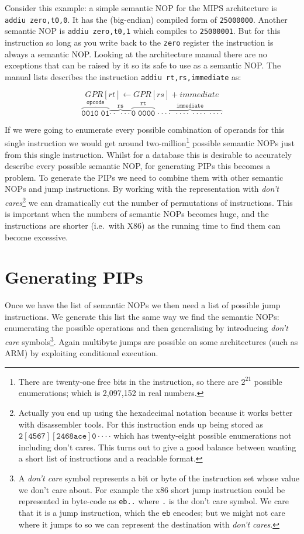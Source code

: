 \documentclass[]{book}
\begin{document}
Consider this example: a simple semantic NOP for the MIPS architecture
is \lstinline!addiu zero,t0,0!. It has the (big-endian) compiled form of
\lstinline!25000000!. Another semantic NOP is
\lstinline!addiu zero,t0,1! which compiles to \lstinline!25000001!. But
for this instruction so long as you write back to the \lstinline!zero!
register the instruction is always a semantic NOP. Looking at the
architecture manual\autocite{MIPSTechnologiesInc:2011ta} there are no
exceptions that can be raised by it so its safe to use as a semantic
NOP. The manual lists describes the instruction
\lstinline!addiu rt,rs,immediate! as:

\[GPR[rt] \gets GPR[rs] + immediate\]
\[\mathtt{\overbrace{0010\;01}^\text{opcode}
\overbrace{\cdot\cdot\;\cdot\cdot\cdot}^\text{rs}
\overbrace{0\;0000}^\text{rt}\; \overbrace{\cdot\cdot\cdot\cdot\;
\cdot\cdot\cdot\cdot\; \cdot\cdot\cdot\cdot\;
\cdot\cdot\cdot\cdot}^\text{immediate}}\]

If we were going to enumerate every possible combination of operands for
this single instruction we would get around two-million\footnote{There
  are twenty-one free bits in the instruction, so there are $2^{21}$
  possible enumerations; which is 2,097,152 in real numbers.} possible
semantic NOPs just from this single instruction. Whilst for a database
this is desirable to accurately describe every possible semantic NOP,
for generating PIPs this becomes a problem. To generate the PIPs we need
to combine them with other semantic NOPs and jump instructions. By
working with the representation with \emph{don't cares}\footnote{Actually
  you end up using the hexadecimal notation because it works better with
  disassembler tools. For this instruction ends up being stored as
  $\mathtt{2[4567][2468ace]0\cdot\cdot\cdot\cdot}$ which has
  twenty-eight possible enumerations not including don't cares. This
  turns out to give a good balance between wanting a short list of
  instructions and a readable format.} we can dramatically cut the
number of permutations of instructions. This is important when the
numbers of semantic NOPs becomes huge, and the instructions are shorter
(i.e.~with X86) as the running time to find them can become excessive.

\section{Generating PIPs}

Once we have the list of semantic NOPs we then need a list of possible
jump instructions. We generate this list the same way we find the
semantic NOPs: enumerating the possible operations and then generalising
by introducing \emph{don't care} symbols\footnote{A \emph{don't care}
  symbol represents a bit or byte of the instruction set whose value we
  don't care about. For example the x86 short jump instruction could be
  represented in byte-code as \lstinline!eb..! where \lstinline!.! is
  the don't care symbol. We care that it is a jump instruction, which
  the \lstinline!eb! encodes; but we might not care where it jumps to so
  we can represent the destination with \emph{don't cares}.}. Again
multibyte jumps are possible on some architectures (such as ARM) by
exploiting conditional execution.
\end{document}
